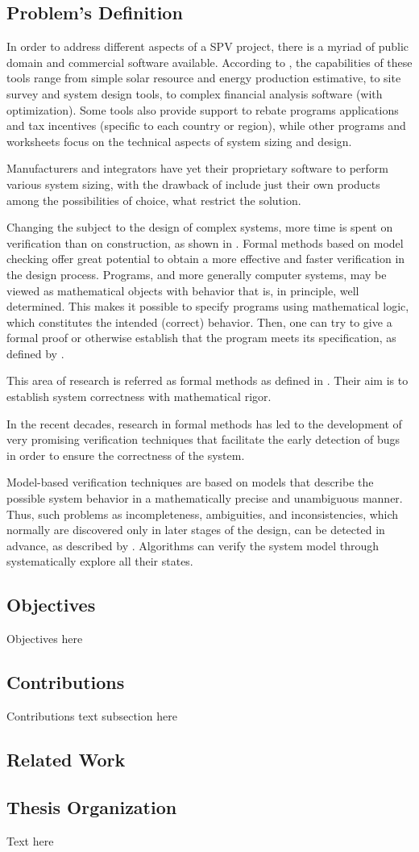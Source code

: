 \subsection{Problem's Definition}
 
In order to address different aspects of a SPV project, there is a myriad of public domain and commercial software available. According to \cite{Brooks}, the capabilities of these tools range from simple solar resource and energy production estimative, to site survey and system design tools, to complex financial analysis software (with optimization). Some tools also provide support to rebate programs applications and tax incentives (specific to each country or region), while other programs and worksheets focus on the technical aspects of system sizing and design.  

Manufacturers and integrators have yet their proprietary software to perform various system sizing, with the drawback of include just their own products among the possibilities of choice, what restrict the solution. 

Changing the subject to the design of complex systems, more time is spent on verification than on construction, as shown in \cite{Baier}. Formal methods based on model checking offer great potential to obtain a more effective and faster verification in the design process. Programs, and more generally computer systems, may be viewed as mathematical objects with behavior that is, in principle, well determined. This makes it possible to specify programs using mathematical logic, which constitutes the intended (correct) behavior. Then, one can try to give a formal proof or otherwise establish that the program meets its specification, as defined by \cite{Trindade}. 

This area of research is referred as formal methods as defined in \cite{Clarkeetal}. Their aim is to establish system correctness with mathematical rigor. 

In the recent decades, research in formal methods has led to the development of very promising verification techniques that facilitate the early detection of bugs in order to ensure the correctness of the system. 

Model-based verification techniques are based on models that describe the possible system behavior in a mathematically precise and unambiguous manner. Thus, such problems as incompleteness, ambiguities, and inconsistencies, which normally are discovered only in later stages of the design, can be detected in advance, as described by \cite{Trindade}. Algorithms can verify the system model through systematically explore all their states.

\subsection{Objectives}
Objectives here

\subsection{Contributions}
Contributions text subsection here
 
\subsection{Related Work}

\subsection{Thesis Organization}
Text here